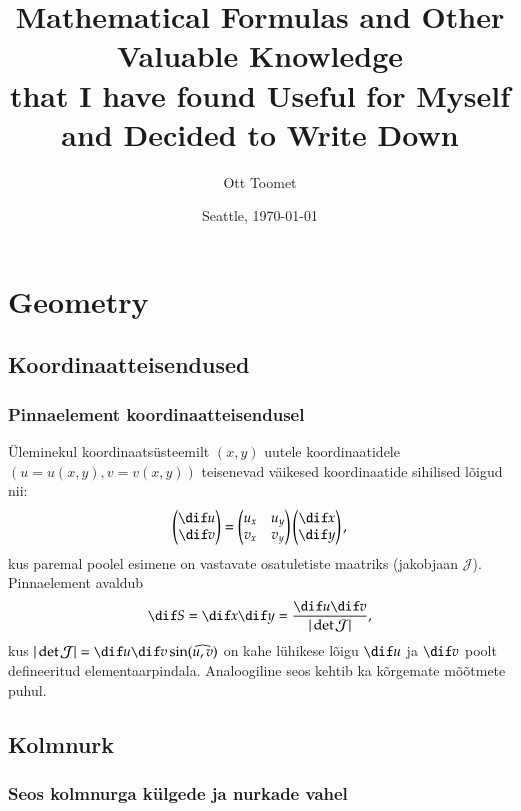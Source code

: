 \documentclass[a4paper]{article}
\title{Mathematical Formulas and Other Valuable Knowledge\\
\normalsize that I have found Useful for Myself\\
and Decided to Write Down}
\author{Ott Toomet}
\date{Seattle, \today}
\numberwithin{equation}{subsection}
\begin{document}
\maketitle

\tableofcontents

\newpage
\section{Geometry}

\subsection{Koordinaatteisendused}
\subsubsection{Pinnaelement koordinaatteisendusel}
Üleminekul koordinaatsüsteemilt $(x,y)$ uutele koordinaatidele
$(u=u(x,y), v=v(x,y))$ teisenevad väikesed koordinaatide sihilised
lõigud nii:
\begin{equation}
\begin{pmatrix}
\dif u\\
\dif v
\end{pmatrix} =
  \begin{pmatrix}
  u_x   & u_y \\
  v_x   & v_y
  \end{pmatrix}
  \begin{pmatrix}
  \dif x\\
  \dif y
  \end{pmatrix},
\end{equation}
kus paremal poolel esimene on vastavate osatuletiste maatriks
(jakobjaan $\mathcal{J}$).
Pinnaelement avaldub
\begin{equation}
\dif S = \dif x \dif y = 
 \frac{\dif u \dif v}{|\det \mathcal{J}|},
\end{equation}
kus
\begin{math}
|\det \mathcal{J}| = \dif u \dif v \sin( \widehat{u,v})
\end{math}
on kahe lühikese lõigu $\dif u$ ja $\dif v$ poolt defineeritud
elementaarpindala.  Analoogiline seos kehtib ka kõrgemate mõõtmete
puhul.


\subsection{Kolmnurk}
\subsubsection{Seos kolmnurga külgede ja nurkade vahel}
\end{document}
